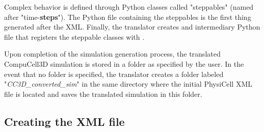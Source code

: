Complex behavior is defined through Python classes called "steppables" (named after "time-\textbf{steps}"). The Python file containing the steppables is the first thing generated after the XML. Finally, the translator creates and intermediary Python file that registers the steppable classes with \ccd.



Upon completion of the simulation generation process, the translated CompuCell3D simulation is stored in a folder as specified by the user. In the event that no folder is specified, the translator creates a folder labeled "\textit{CC3D\_converted\_sim}" in the same directory where the initial PhysiCell XML file is located and saves the translated simulation in this folder.

\subsection{Creating the XML file}\label{sec:trans:gen:xml}

